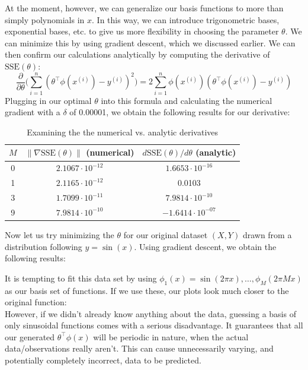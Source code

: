 \documentclass[11pt,letterpaper]{article}
\begin{document}
At the moment, however, we can generalize our basis functions to more than simply polynomials in $x$. In this way, we can introduce trigonometric bases, exponential bases, etc. to give us more flexibility in choosing the parameter $\theta$. 
We can minimize this by using gradient descent, which we discussed earlier. We can then confirm our calculations analytically by computing the derivative of $\text{SSE}(\theta)$:
\[ \frac{\partial}{\partial\theta}\Big(\sum_{i=1}^n (\theta^\intercal\phi(x^{(i)}) - y^{(i)})^2\Big) = 2\sum_{i=1}^n \phi(x^{(i)})(\theta^\intercal\phi(x^{(i)}) - y^{(i)}) \]
Plugging in our optimal $\theta$ into this formula and calculating the numerical gradient with a $\delta$ of 0.00001, we obtain the following results for our derivative:
\begin{table}[h]
\centering
\caption{Examining the the numerical vs. analytic derivatives}
\begin{tabular}{c|c|c}
$M$& $\lVert\nabla\text{SSE}(\theta)\rVert$ (numerical) & $d\text{SSE} (\theta)/d\theta$ (analytic)\\\hline
0       &  $2.1067\cdot10^{-12}$  & $1.6653\cdot10^{-16}$   \\
1       & $2.1165\cdot10^{-12}$  & 0.0103 \\
3       & $1.7099\cdot10^{-11}$ & $7.9814\cdot10^{-10}$  \\
9      &   $7.9814\cdot 10^{-10}$    & $-1.6414\cdot 10^{-07}$
\end{tabular}
\end{table}

Now let us try minimizing the $\theta$ for our original dataset $(X, Y)$ drawn from a distribution following $y = \sin(x)$. Using gradient descent, we obtain the following results:


It is tempting to fit this data set by using $\phi_1(x) = \sin(2\pi x), \ldots , \phi_M(2\pi Mx)$ as our basis set of functions. If we use these, our plots look much closer to the original function:\\

However, if we didn't already know anything about the data, guessing a basis of only sinusoidal functions comes with a serious disadvantage. It guarantees that all our generated $\theta^\intercal\phi(x)$ will be periodic in nature, when the actual data/observations really aren't. This can cause unnecessarily varying, and potentially completely incorrect, data to be predicted.\\
\end{document}
